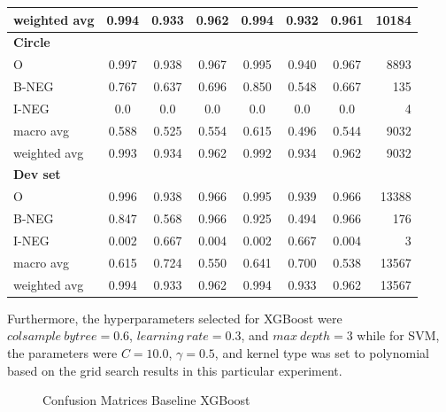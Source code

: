 \begin{table}[!ht]
\begin{tabular}{lccc|cccr}
weighted avg       &  0.994 &  0.933 &  0.962 & 0.994 & 0.932 & 0.961 & 10184 \\
\hline
\textbf{Circle}    &        &        &        &       &       &       &   \\
O                  &  0.997 &  0.938 &  0.967 & 0.995 & 0.940 & 0.967 & 8893 \\
B-NEG              &  0.767 &  0.637 &  0.696 & 0.850 & 0.548 & 0.667 & 135 \\
I-NEG              &    0.0 &    0.0 &    0.0 &  0.0  & 0.0   &   0.0 & 4 \\
macro avg          &  0.588 &  0.525 &  0.554 & 0.615 & 0.496 & 0.544 & 9032 \\
weighted avg       &  0.993 &  0.934 &  0.962 & 0.992 & 0.934 & 0.962 & 9032 \\
\hline
\textbf{Dev set}   &        &        &        &       &       & &   \\
O                  &  0.996 &  0.938 &  0.966 & 0.995 & 0.939 & 0.966 & 13388 \\
B-NEG              &  0.847 &  0.568 &  0.966 & 0.925 & 0.494 & 0.966 & 176 \\
I-NEG              &  0.002 &  0.667 &  0.004 & 0.002 & 0.667 & 0.004 & 3 \\
macro avg          &  0.615 &  0.724 &  0.550 & 0.641 & 0.700 & 0.538 & 13567 \\
weighted avg       &  0.994 &  0.933 &  0.962 & 0.994 & 0.933 & 0.962 & 13567 \\
\hline
\end{tabular}
\end{table}
Furthermore, the hyperparameters selected for XGBoost were $colsample \ bytree = 0.6$, $learning \ rate = 0.3$, and $max \ depth = 3$ while for SVM, the parameters were $C = 10.0$, $\gamma = 0.5$, and kernel type was set to polynomial based on the grid search results in this particular experiment.

\begin{figure}[!h]
\centering
  \caption{Confusion Matrices Baseline XGBoost}
  \label{fig:base_line_xgb}
\end{figure}

